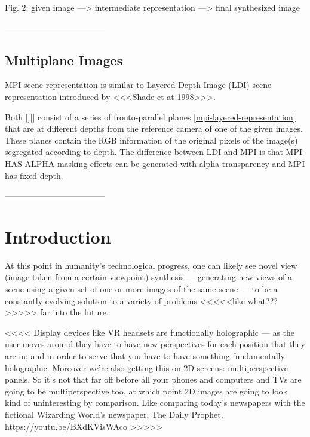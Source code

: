 Fig. 2: given image ---> intermediate representation ---> final synthesized image



------------------------------------

\section{Multiplane Images}

MPI scene representation is similar to Layered Depth Image (LDI) scene representation introduced by <<<Shade et at 1998>>>.

Both [][] consist of a series of fronto-parallel planes \ref{mpi-layered-representation} that are at different depths from the reference camera of one of the given images. These planes contain the RGB information of the original pixels of the image(s) segregated according to depth. The difference between LDI and MPI is that MPI HAS ALPHA masking effects can be generated with alpha transparency and MPI has fixed depth. 



------------------------------------




\chapter{Introduction}\label{ch1:introduction}


At this point in humanity's technological progress, one can likely see novel view (image taken from a certain viewpoint) synthesis --- generating new views of a scene using a given set of one or more images of the same scene --- to be a constantly evolving solution to a variety of problems <<<<<like what???>>>>> far into the future.

<<<< Display devices like VR headsets are functionally holographic --- as the user moves around they have to have new perspectives for each position that they are in; and in order to serve that you have to have something fundamentally holographic. Moreover we're also getting this on 2D screens: multiperspective panels. So it's not that far off before all your phones and computers and TVs are going to be multiperspective too, at which point 2D images are going to look kind of uninteresting by comparison. Like comparing today's newspapers with the fictional Wizarding World's newspaper, The Daily Prophet. https://youtu.be/BXdKVisWAco >>>>>

